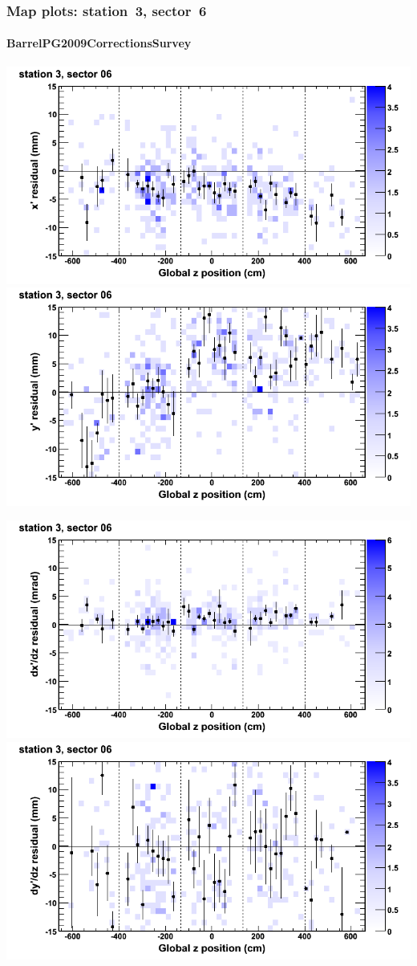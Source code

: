 \documentclass[compress]{beamer}
\begin{document}
\begin{frame}
\frametitle{Map plots: station~3, sector~6}
\framesubtitle{BarrelPG2009CorrectionsSurvey}
\includegraphics[width=0.5\linewidth]{mapplots_01/DTvsz_st3sec06_x.png}
\includegraphics[width=0.5\linewidth]{mapplots_01/DTvsz_st3sec06_y.png}

\includegraphics[width=0.5\linewidth]{mapplots_01/DTvsz_st3sec06_dxdz.png}
\includegraphics[width=0.5\linewidth]{mapplots_01/DTvsz_st3sec06_dydz.png}
\end{frame}
\end{document}
